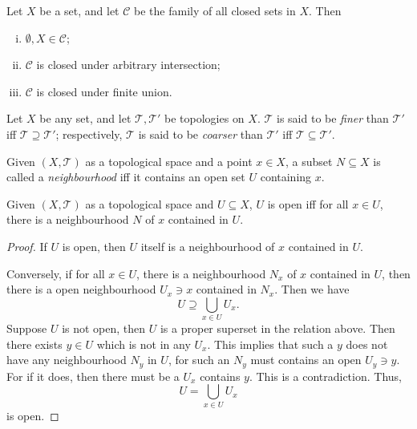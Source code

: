 \begin{proposition}
	\label{prop: dark side of topology}
	Let $X$ be a set, and let $\mathcal C$ be the family of all closed sets in $X$. Then
	\begin{enumerate}[(i)]
		\item $\emptyset, X \in \mathcal C$;
		\item $\mathcal C$ is closed under arbitrary intersection;
		\item $\mathcal C$ is closed under finite union.
	\end{enumerate}
\end{proposition}


\begin{definition}
	\label{def: finer and coarser topology} Let $X$ be any set, and let $\mathcal T, \mathcal T'$ be topologies on $X$. $\mathcal T$ is said to be \textit{finer} than $\mathcal T'$ iff $\mathcal T \supseteq \mathcal T'$; respectively, $\mathcal T$ is said to be \textit{coarser} than $\mathcal T'$ iff $\mathcal T \subseteq \mathcal T'$.
\end{definition}


\begin{definition}
	[neighbourhood]
	\label{def: neighbourhood}
	Given $(X, \mathcal T)$ as a topological space and a point $x \in X$, a subset $N \subseteq X$ is called a \textit{neighbourhood} iff it contains an open set $U$ containing $x$.
\end{definition}


\begin{proposition}
	\label{prop: alt-def of open sets by neighbourhoods}
	Given $(X, \mathcal T)$ as a topological space and $U \subseteq X$, $U$ is open iff for all $x \in U$, there is a neighbourhood $N$ of $x$ contained in $U$.
	
	\begin{proof}
		If $U$ is open, then $U$ itself is a neighbourhood of $x$ contained in $U$.
		
		Conversely, if for all $x \in U$, there is a neighbourhood $N_x$ of $x$ contained in $U$, then there is a open neighbourhood $U_x \ni x$ contained in $N_x$. Then we have
		$$
		U \supseteq \bigcup_{x \in U} U_x.
		$$
		Suppose $U$ is not open, then $U$ is a proper superset in the relation above. Then there exists $y \in U$ which is not in any $U_x$. This implies that such a $y$ does not have any neighbourhood $N_y$ in $U$, for such an $N_y$ must contains an open $U_y \ni y$. For if it does, then there must be a $U_x$ contains $y$. This is a contradiction. Thus,
		$$
		U = \bigcup_{x \in U} U_x
		$$
		is open.
	\end{proof}
\end{proposition}


